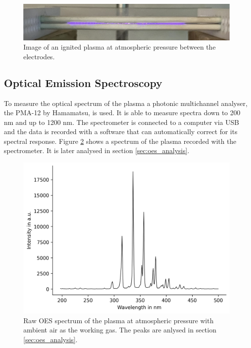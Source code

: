 \begin{figure}
    \centering
    \includegraphics[width=1\textwidth]{images/Plasma.png}
    \caption[Image of the APP]{Image of an ignited plasma at atmospheric pressure between the electrodes.}
    \label{fig:plasma}
\end{figure}


\subsection{Optical Emission Spectroscopy}
\label{sec:oes}
To measure the optical spectrum of the plasma a photonic multichannel analyser, the \textsc{PMA-12} by Hamamatsu, is used. It is able to measure spectra down to 200 nm and up to 1200 nm. The spectrometer is connected to a computer via USB and the data is recorded with a software that can automatically correct for its spectral response. Figure \ref{fig:oes} shows a spectrum of the plasma recorded with the spectrometer. It is later analysed in section \ref{sec:oes_analysis}.  

\begin{figure}
    \centering
    \includegraphics[width=.8\textwidth]{images/OES.png}
    \caption[Raw OES spectrum of the APP]{Raw OES spectrum of the plasma at atmospheric pressure with ambient air as the working gas. The peaks are anlysed in section \ref{sec:oes_analysis}.}
    \label{fig:oes}
\end{figure}

